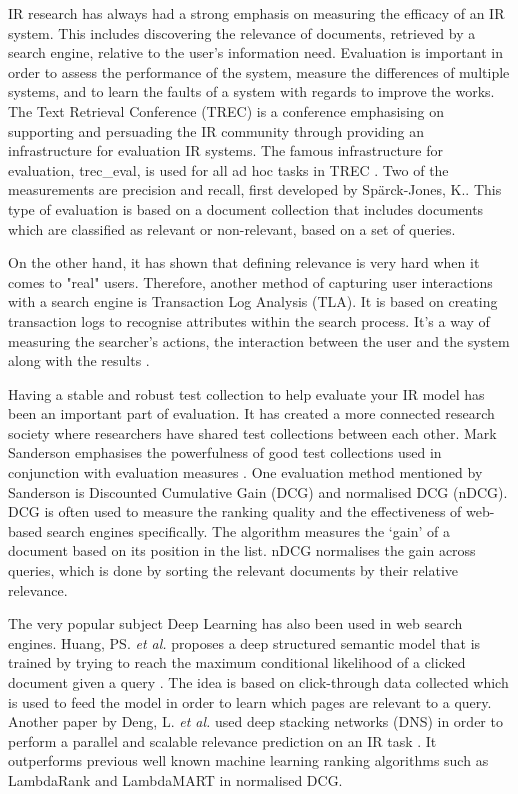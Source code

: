 IR research has always had a strong emphasis on measuring the efficacy of an IR system. This includes discovering the relevance of documents, retrieved by a search engine, relative to the user's information need. Evaluation is important in order to assess the performance of the system, measure the differences of multiple systems, and to learn the faults of a system with regards to improve the works.  The Text Retrieval Conference (TREC) is a conference emphasising on supporting and persuading the IR community through providing an infrastructure for evaluation IR systems. The famous infrastructure for evaluation, trec\_eval, is used for all ad hoc tasks in TREC \cite{voorhees:evaluation}. Two of the measurements are precision and recall, first developed by Spärck-Jones, K.\cite{jones1981information}. This type of evaluation is based on a document collection that includes documents which are classified as relevant or non-relevant, based on a set of queries.

On the other hand, it has shown that defining relevance is very hard when it comes to "real" users\cite{mizzaro1997relevance}. Therefore, another method of capturing user interactions with a search engine is Transaction Log Analysis (TLA). It is based on creating transaction logs to recognise attributes within the search process. It's a way of measuring the searcher's actions, the interaction between the user and the system along with the results \cite{glaser1967discovery}. 

Having a stable and robust test collection to help evaluate your IR model has been an important part of evaluation. It has created a more connected research society where researchers have shared test collections between each other. Mark Sanderson emphasises the powerfulness of good test collections used in conjunction with evaluation measures \cite{sanderson:evaluation}. One evaluation method mentioned by Sanderson is Discounted Cumulative Gain (DCG) and normalised DCG (nDCG)\cite{sanderson:evaluation}. DCG is often used to measure the ranking quality and the effectiveness of web-based search engines specifically. The algorithm measures the ‘gain’ of a document based on its position in the list. nDCG normalises the gain across queries, which is done by sorting the relevant documents by their relative relevance.

The very popular subject Deep Learning has also been used in web search engines. Huang, PS. \emph{et al.} proposes a deep structured semantic model that is trained by trying to reach the maximum conditional likelihood of a clicked document given a query \cite{huang2013learning}. The idea is based on click-through data collected which is used to feed the model in order to learn which pages are relevant to a query. Another paper by Deng, L. \emph{et al.} used deep stacking networks (DNS) in order to perform a parallel and scalable relevance prediction on an IR task \cite{deng2013deep}. It outperforms previous well known machine learning ranking algorithms such as LambdaRank and LambdaMART \cite{burges2010ranknet} in normalised DCG.


